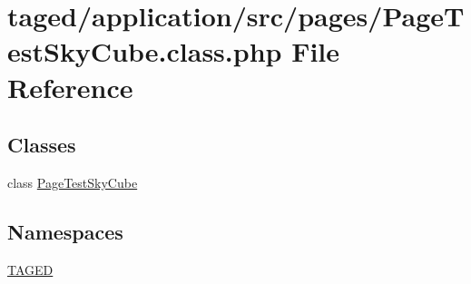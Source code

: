 \hypertarget{_page_test_sky_cube_8class_8php}{}\section{taged/application/src/pages/\+Page\+Test\+Sky\+Cube.class.\+php File Reference}
\label{_page_test_sky_cube_8class_8php}
\subsection*{Classes}
\begin{DoxyCompactItemize}
\item 
class \hyperlink{class_page_test_sky_cube}{Page\+Test\+Sky\+Cube}
\end{DoxyCompactItemize}
\subsection*{Namespaces}
\begin{DoxyCompactItemize}
\item 
 \hyperlink{namespace_t_a_g_e_d}{T\+A\+G\+ED}
\end{DoxyCompactItemize}
